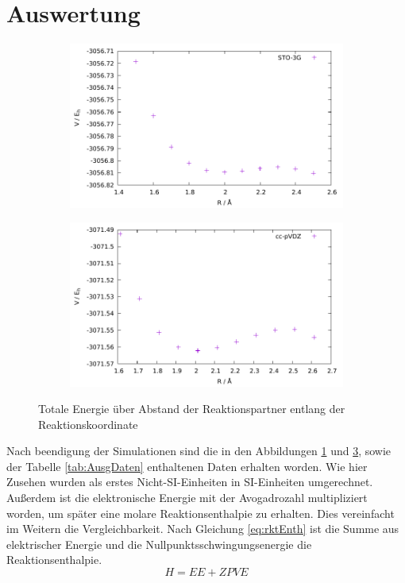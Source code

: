 \section{Auswertung}


\begin{figure}
	\centering
	\begin{subfigure}{0.49\linewidth}
		\includegraphics[width=\linewidth]{STO.pdf}
		\label{abb:STO}
	\end{subfigure}
	\hfill
	\begin{subfigure}{0.49\linewidth}
		\includegraphics[width=\linewidth]{cc.pdf}
 		\label{abb:cc}
	\end{subfigure}
	\caption{Totale Energie über Abstand der Reaktionspartner entlang der Reaktionskoordinate}
\end{figure}
Nach beendigung der Simulationen sind die in den Abbildungen \ref{abb:STO} und \ref{abb:cc}, sowie der Tabelle \ref{tab:AusgDaten} enthaltenen Daten erhalten worden.
Wie hier Zusehen wurden als erstes Nicht-SI-Einheiten in SI-Einheiten umgerechnet. 
Außerdem ist die elektronische Energie mit der Avogadrozahl multipliziert worden, um später eine molare Reaktionsenthalpie zu erhalten.
Dies vereinfacht im Weitern die Vergleichbarkeit.
Nach Gleichung \ref{eq:rktEnth} ist die Summe aus elektrischer Energie und die Nullpunktsschwingungsenergie die Reaktionsenthalpie.
\begin{equation}
H=EE+ZPVE
\label{eq:rktEnth}
\end{equation}

